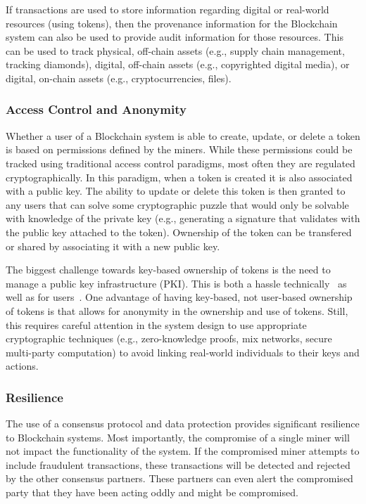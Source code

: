 If transactions are used to store information regarding digital or real-world resources (using tokens), then the provenance information for the Blockchain system can also be used to provide audit information for those resources.
This can be used to track physical, off-chain assets (e.g., supply chain management, tracking diamonds), digital, off-chain assets (e.g., copyrighted digital media), or digital, on-chain assets (e.g., cryptocurrencies, files).
 
\subsubsection{Access Control and Anonymity}
Whether a user of a Blockchain system is able to create, update, or delete a token is based on permissions defined by the miners.
While these permissions could be tracked using traditional access control paradigms, most often they are regulated cryptographically.
In this paradigm, when a token is created it is also associated with a public key.
The ability to update or delete this token is then granted to any users that can solve some cryptographic puzzle that would only be solvable with knowledge of the private key (e.g., generating a signature that validates with the public key attached to the token).
Ownership of the token can be transfered or shared by associating it with a new public key.

The biggest challenge towards key-based ownership of tokens is the need to manage a public key infrastructure (PKI).
This is both a hassle technically~\cite{CT} as well as for users~\cite{ruoti2015johnny,barber2012bitter}.
One advantage of having key-based, not user-based ownership of tokens is that allows for anonymity in the ownership and use of tokens.
Still, this requires careful attention in the system design to use appropriate cryptographic techniques (e.g., zero-knowledge proofs, mix networks, secure multi-party computation) to avoid linking real-world individuals to their keys and actions.
 
\subsubsection{Resilience}
The use of a consensus protocol and data protection provides significant resilience to Blockchain systems.
Most importantly, the compromise of a single miner will not impact the functionality of the system.
If the compromised miner attempts to include fraudulent transactions, these transactions will be detected and rejected by the other consensus partners.
These partners can even alert the compromised party that they have been acting oddly and might be compromised.

